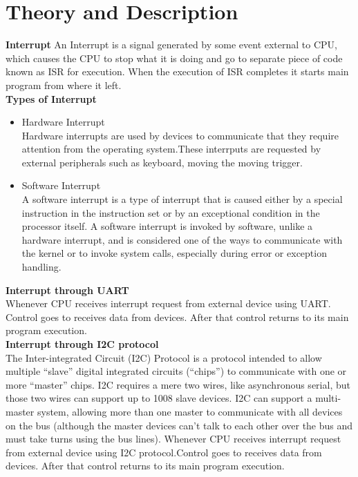 \documentclass[11pt,a4paper]{article}
\begin{document}
	\section{Theory and Description}
	\textbf{Interrupt}
	\newline
	 An Interrupt is a signal generated by some event external to CPU, which causes the CPU to stop what it is doing and go to separate piece of code known as ISR for execution. When the execution of ISR completes it starts main program from where it left. \\
	 \flushleft
	 \textbf{Types of Interrupt} \\
	 \begin{itemize}
	 	\item{Hardware Interrupt} \\
	 	Hardware interrupts are used by devices to communicate that they require attention from the operating system.These interrputs are requested by external peripherals such as keyboard, moving the moving trigger.
	 	\item {Software Interrupt} \\
	 	A software interrupt is a type of interrupt that is caused either by a special instruction in the instruction set or by an exceptional condition in the processor itself. A software interrupt is invoked by software, unlike a hardware interrupt, and is considered one of the ways to communicate with the kernel or to invoke system calls, especially during error or exception handling.
	 \end{itemize}
	 \textbf{Interrupt through UART}\\
	 
	 Whenever CPU receives interrupt request from external device using UART. Control goes to receives data from devices. After that control returns to its main program execution.\\
	 
	 \textbf{Interrupt through I2C protocol}\\
	 
	 The Inter-integrated Circuit (I2C) Protocol is a protocol intended to allow multiple “slave” digital integrated circuits (“chips”) to communicate with one or more “master” chips. I2C requires a mere two wires, like asynchronous serial, but those two wires can support up to 1008 slave devices. 
	  I2C can support a multi-master system, allowing more than one master to communicate with all devices on the bus (although the master devices can’t talk to each other over the bus and must take turns using the bus lines). Whenever CPU receives interrupt request from external device using I2C protocol.Control goes to receives data from devices. After that control returns to its main program execution.\\
	  
\end{document}
